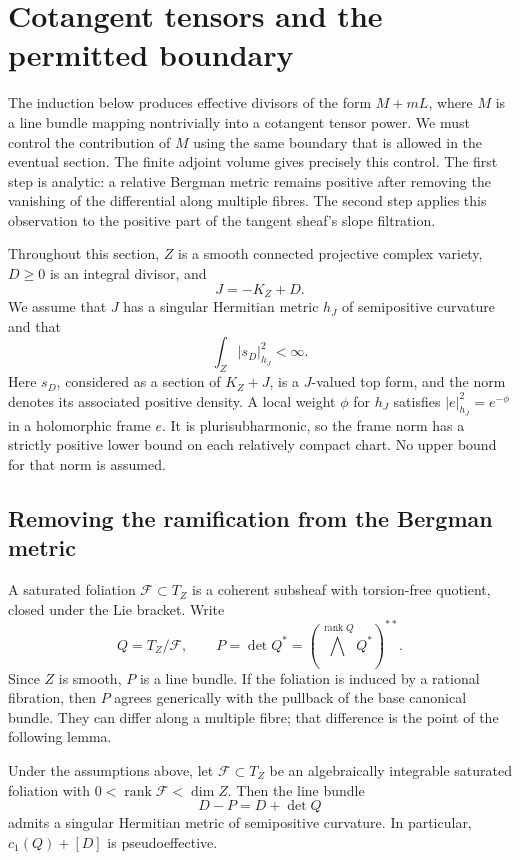 \section{Cotangent tensors and the permitted boundary}
\label{sec:h:slope}\label{sec:slope}

The induction below produces effective divisors of the form $M+mL$,
where $M$ is a line bundle mapping nontrivially into a cotangent tensor
power.  We must
control the contribution of $M$ using the same boundary that is allowed
in the eventual section.  The finite adjoint volume gives precisely
this control.  The first step is analytic: a relative Bergman metric
remains positive after removing the vanishing of the differential along
multiple fibres.  The second step applies this observation to the
positive part of the tangent sheaf's slope filtration.

Throughout this section, $Z$ is a smooth connected projective complex
variety, $D\geq0$ is an integral divisor, and
\[
                        J=-K_Z+D.
\]
We assume that $J$ has a singular Hermitian metric $h_J$ of semipositive
curvature and that
\begin{equation}\label{eq:h:slope:volume}
              \int_Z |s_D|_{h_J}^2<\infty.
\end{equation}
Here $s_D$, considered as a section of $K_Z+J$, is a $J$-valued top
form, and the norm denotes its associated positive density.  A local
weight $\phi$ for $h_J$ satisfies $|e|_{h_J}^2=e^{-\phi}$ in a
holomorphic frame $e$.  It is plurisubharmonic, so the frame norm has a
strictly positive lower bound on each relatively compact chart.  No
upper bound for that norm is assumed.

\subsection{Removing the ramification from the Bergman metric}

A saturated foliation $\mathcal F\subset T_Z$ is a coherent subsheaf
with torsion-free quotient, closed under the Lie bracket.  Write
\[
 Q=T_Z/\mathcal F,\qquad
 P=\det Q^*=(\bigwedge^{\operatorname{rank}Q}Q^*)^{**}.
\]
Since $Z$ is smooth, $P$ is a line bundle.  If the foliation is induced
by a rational fibration, then $P$ agrees generically with the pullback
of the base canonical bundle.  They can differ along a multiple fibre;
that difference is the point of the following lemma.

\begin{lemma}\label{h:slope:foliation}
Under the assumptions above, let $\mathcal F\subset T_Z$ be an
algebraically integrable saturated foliation with
$0<\operatorname{rank}\mathcal F<\dim Z$.  Then the line bundle
\[
                    D-P=D+\det Q
\]
admits a singular Hermitian metric of semipositive curvature.  In
particular, $c_1(Q)+[D]$ is pseudoeffective.
\end{lemma}

